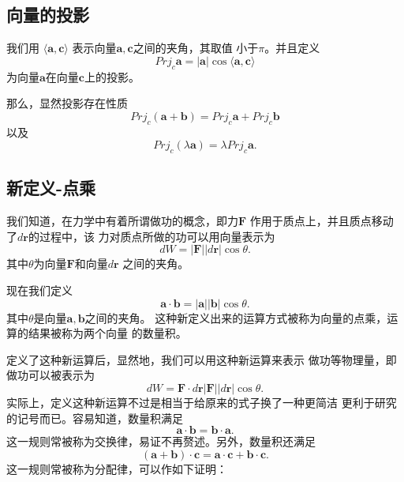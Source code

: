 \subsection{向量的投影}
\begin{definition}
    我们用
    $\langle \boldsymbol{a},\boldsymbol{c}\rangle$
    表示向量$\boldsymbol{a},\boldsymbol{c}$之间的夹角，其取值
    小于$\pi$。并且定义
    \begin{equation}
        Prj_c\boldsymbol{a}=|\boldsymbol{a} |
        \cos\langle \boldsymbol{a},\boldsymbol{c}\rangle  
    \end{equation}
    为向量$\boldsymbol{a}$在向量$\boldsymbol{c}$上的投影。
\end{definition}
那么，显然投影存在性质
\begin{equation}
    Prj_c(\boldsymbol{a}+\boldsymbol{b})=
    Prj_c\boldsymbol{a}+Prj_c\boldsymbol{b}
\end{equation}
以及 
\begin{equation}
    Prj_c(\lambda\boldsymbol{a})=\lambda
    Prj_c\boldsymbol{a}.
\end{equation}
\subsection{新定义-点乘}
我们知道，在力学中有着所谓做功的概念，即力$\boldsymbol{F}$
作用于质点上，并且质点移动了$d\boldsymbol{r}$的过程中，该 
力对质点所做的功可以用向量表示为
\begin{equation}
    dW=| \boldsymbol{F}| |d\boldsymbol{r} | \cos\theta .
\end{equation}
其中$\theta $为向量$\boldsymbol{F}$和向量$d\boldsymbol{r}$
之间的夹角。

\begin{definition}
    现在我们定义
    \begin{equation}
        \boldsymbol{a}\cdot \boldsymbol{b}=
        | \boldsymbol{a}| |\boldsymbol{b} | \cos\theta.
    \end{equation}
    其中$\theta $是向量$\boldsymbol{a},\boldsymbol{b}$之间的夹角。
    这种新定义出来的运算方式被称为向量的点乘，运算的结果被称为两个向量
    的数量积。
\end{definition}

定义了这种新运算后，显然地，我们可以用这种新运算来表示
做功等物理量，即做功可以被表示为
\begin{equation}
    dW=\boldsymbol{F}\cdot d\boldsymbol{r}
    | \boldsymbol{F}| |d\boldsymbol{r} | \cos\theta .
\end{equation}
实际上，定义这种新运算不过是相当于给原来的式子换了一种更简洁
更利于研究的记号而已。容易知道，数量积满足
\begin{equation}
    \boldsymbol{a}\cdot \boldsymbol{b}=\boldsymbol{b}
    \cdot \boldsymbol{a}.
\end{equation}
这一规则常被称为交换律，易证不再赘述。另外，数量积还满足
\begin{equation}
    (\boldsymbol{a}+\boldsymbol{b})\cdot \boldsymbol{c}
    =\boldsymbol{a}\cdot \boldsymbol{c}
    +\boldsymbol{b}\cdot \boldsymbol{c}.
\end{equation}
这一规则常被称为分配律，可以作如下证明：

